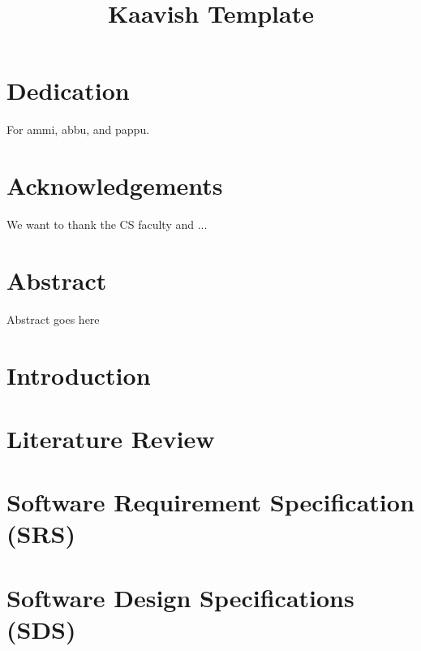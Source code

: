 \documentclass[12pt]{report}
\title{Kaavish Template}
\begin{document}



\chapter*{Dedication}
For ammi, abbu, and pappu.

\chapter*{Acknowledgements}
We want to thank the CS faculty and ...

\chapter*{Abstract}
Abstract goes here

\tableofcontents
\listoffigures
\listoftables


\chapter{Introduction}
\label{chap:intro}


\chapter{Literature Review}
\label{chap:lit}


\chapter{Software Requirement Specification (SRS)}
\label{chap:srs}


\chapter{Software Design Specifications (SDS)}
\label{chap:sds}


\end{document}
